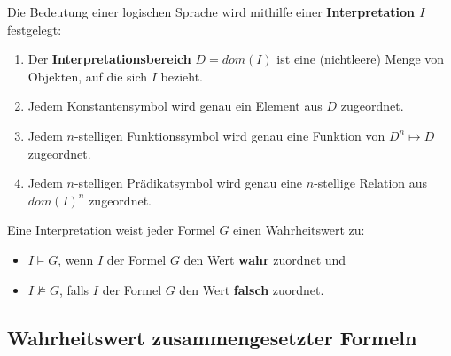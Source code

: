 \documentclass[runningheads,deutsch]{llncs}
\begin{document}
Die Bedeutung einer logischen Sprache wird mithilfe einer \textbf{Interpretation $I$} festgelegt:

\begin{enumerate}
    \item Der \textbf{Interpretationsbereich} $D = dom(I)$ ist eine (nichtleere) Menge von Objekten, auf die sich $I$ bezieht.
    \item Jedem Konstantensymbol wird genau ein Element aus $D$ zugeordnet.
    \item Jedem $n$-stelligen Funktionssymbol wird genau eine Funktion von $D^n \mapsto D$ zugeordnet.
    \item Jedem $n$-stelligen Prädikatsymbol wird genau eine $n$-stellige Relation aus $dom(I)^n$ zugeordnet.
\end{enumerate}

Eine Interpretation weist jeder Formel $G$ einen Wahrheitswert zu:

\begin{itemize}
    \item $I \vDash G$, wenn $I$ der Formel $G$ den Wert \textbf{wahr} zuordnet und
    \item $I \nvDash G$, falls $I$ der Formel $G$ den Wert \textbf{falsch} zuordnet.
\end{itemize}

\subsection{Wahrheitswert zusammengesetzter Formeln}
\end{document}
